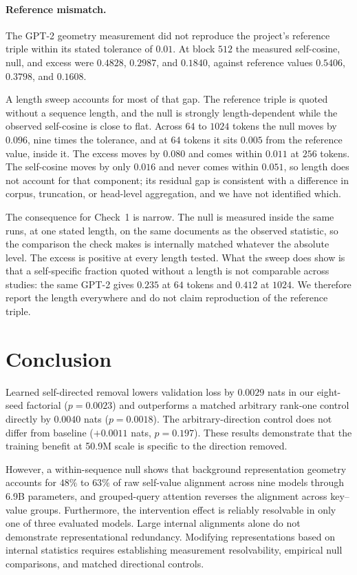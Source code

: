 \documentclass{article} %
\begin{document}
\paragraph{Reference mismatch.} The GPT-2 geometry measurement did not
reproduce the project's reference triple within its stated tolerance of
$0.01$. At block $512$ the measured self-cosine, null, and excess were
$0.4828$, $0.2987$, and $0.1840$, against reference values $0.5406$,
$0.3798$, and $0.1608$.

A length sweep accounts for most of that gap. The reference triple is quoted
without a sequence length, and the null is strongly length-dependent while the
observed self-cosine is close to flat. Across $64$ to $1024$ tokens the null
moves by $0.096$, nine times the tolerance, and at $64$ tokens it sits $0.005$
from the reference value, inside it. The excess moves by $0.080$ and comes
within $0.011$ at $256$ tokens. The self-cosine moves by only $0.016$ and
never comes within $0.051$, so length does not account for that component; its
residual gap is consistent with a difference in corpus, truncation, or
head-level aggregation, and we have not identified which.

The consequence for Check~1 is narrow. The null is measured inside the same
runs, at one stated length, on the same documents as the observed statistic,
so the comparison the check makes is internally matched whatever the absolute
level. The excess is positive at every length tested. What the sweep does show
is that a self-specific fraction quoted without a length is not comparable
across studies: the same GPT-2 gives $0.235$ at $64$ tokens and $0.412$ at
$1024$. We therefore report the length everywhere and do not claim
reproduction of the reference triple.

\section{Conclusion}

Learned self-directed removal lowers validation loss by $0.0029$ nats in our
eight-seed factorial ($p = 0.0023$) and outperforms a matched arbitrary rank-one
control directly by $0.0040$ nats ($p = 0.0018$). The arbitrary-direction control
does not differ from baseline ($+0.0011$ nats, $p = 0.197$). These results
demonstrate that the training benefit at 50.9M scale is specific to the
direction removed.

However, a within-sequence null shows that background representation geometry
accounts for $48\%$ to $63\%$ of raw self-value alignment across nine models
through 6.9B parameters, and grouped-query attention reverses the alignment
across key--value groups. Furthermore, the intervention effect is reliably
resolvable in only one of three evaluated models. Large internal alignments alone
do not demonstrate representational redundancy. Modifying representations based
on internal statistics requires establishing measurement resolvability,
empirical null comparisons, and matched directional controls.
\end{document}
